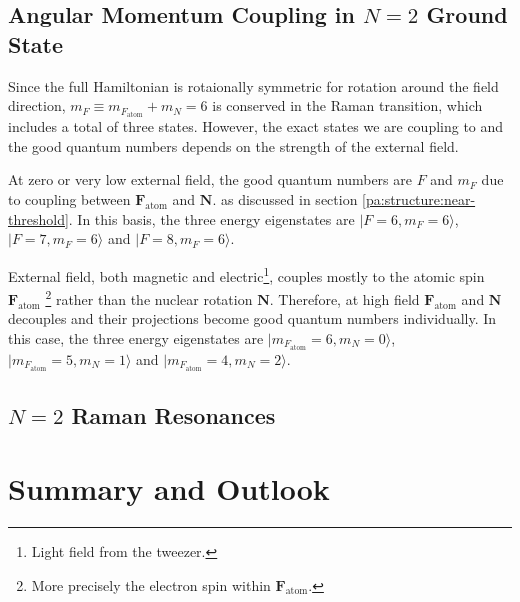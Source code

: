 \subsection{Angular Momentum Coupling in $N=2$ Ground State}

Since the full Hamiltonian is rotaionally symmetric for rotation around the field direction,
$m_F\equiv m_{F_{\mathrm{atom}}}+m_{N}=6$ is conserved in the Raman transition,
which includes a total of three states.
However, the exact states we are coupling to and the good quantum numbers depends on
the strength of the external field.

At zero or very low external field, the good quantum numbers are $F$ and $m_F$
due to coupling between $\mathbf{F}_{\mathrm{atom}}$ and $\mathbf{N}$.
as discussed in section \ref{pa:structure:near-threshold}.
In this basis, the three energy eigenstates are
$|F=6,m_F=6\rangle$, $|F=7,m_F=6\rangle$ and $|F=8,m_F=6\rangle$.

External field, both magnetic and electric\footnote{Light field from the tweezer.},
couples mostly to the atomic spin $\mathbf{F}_{\mathrm{atom}}$
\footnote{More precisely the electron spin within $\mathbf{F}_{\mathrm{atom}}$.}
rather than the nuclear rotation $\mathbf{N}$.
Therefore, at high field $\mathbf{F}_{\mathrm{atom}}$ and $\mathbf{N}$
decouples and their projections become good quantum numbers individually.
In this case, the three energy eigenstates are
$|m_{F_\mathrm{atom}}=6,m_N=0\rangle$, $|m_{F_\mathrm{atom}}=5,m_N=1\rangle$ and
$|m_{F_\mathrm{atom}}=4,m_N=2\rangle$.

\subsection{$N=2$ Raman Resonances}


\section{Summary and Outlook}
